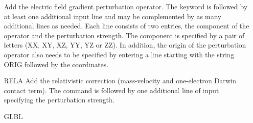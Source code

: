 \begin{keywordlist}
Add the electric field gradient perturbation operator.
The keyword is followed by at least one additional
input line and may be complemented by as many additional lines as
needed. Each line consists of two entries, the component
of the operator and the perturbation strength. The component is
specified by a pair of letters (XX, XY, XZ, YY, YZ or ZZ).
In addition, the origin of the perturbation operator also needs to be specified
by entering a line starting with the string ORIG followed by the coordinates.
\item[RELA]
Add the relativistic correction (mass-{}velocity and one-{}electron
Darwin contact term). The command is followed by one additional line
of input specifying the perturbation strength.
\item[GLBL]

\end{keywordlist}
